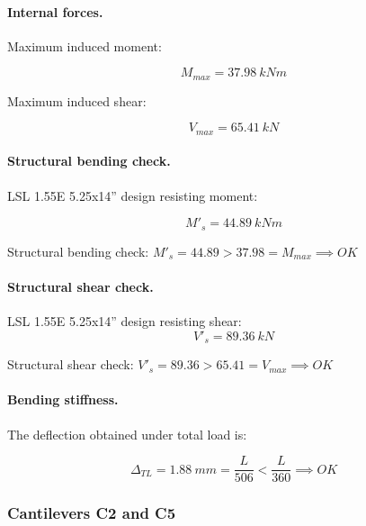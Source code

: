 \paragraph{Internal forces.}

\noindent Maximum induced moment:

\begin{equation}
  M_{max}= 37.98\ kN m
\end{equation}

\noindent Maximum induced shear:

\begin{equation}
  V_{max}= 65.41\ kN
\end{equation}

\paragraph{Structural bending check.}

\noindent LSL 1.55E 5.25x14'' design resisting moment:

\begin{equation}
  M'_s= 44.89\ kN m
\end{equation}

\noindent Structural bending check: $M'_s = 44.89 > 37.98 = M_{max} \implies OK$

\paragraph{Structural shear check.}

\noindent LSL 1.55E 5.25x14'' design resisting shear:
\begin{equation}
  V'_s= 89.36\ kN
\end{equation}

\noindent Structural shear check: $V'_s = 89.36 > 65.41 = V_{max} \implies OK$

\paragraph{Bending stiffness.}
The deflection obtained under total load is:

\begin{equation}
  \Delta_{TL}= 1.88\ mm= \frac{L}{506} < \frac{L}{360} \implies OK
\end{equation}

\subsubsection{Cantilevers C2 and C5}

